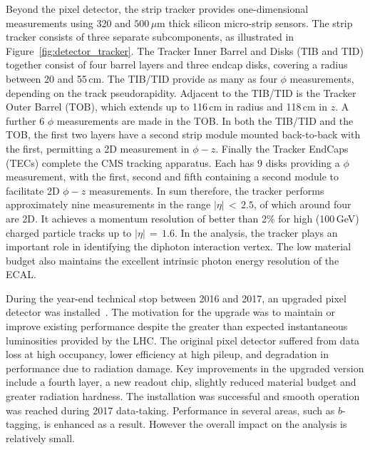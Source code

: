 Beyond the pixel detector, the strip tracker provides one-dimensional measurements using 320 and $500\,\mu\textrm{m}$ thick silicon micro-strip sensors.
The strip tracker consists of three separate subcomponents, as illustrated in Figure~\ref{fig:detector_tracker}.
The Tracker Inner Barrel and Disks (TIB and TID) together consist of four barrel layers and three endcap disks, covering a radius between 20 and 55\,cm. %
The TIB/TID provide as many as four $\phi$ measurements, depending on the track pseudorapidity.
Adjacent to the TIB/TID is the Tracker Outer Barrel (TOB), which extends up to 116\,cm in radius and 118\,cm in $z$.
A further 6 $\phi$ measurements are made in the TOB.
In both the TIB/TID and the TOB, the first two layers have a second strip module mounted back-to-back with the first, permitting a 2D measurement in $\phi-z$.
Finally the Tracker EndCaps (TECs) complete the CMS tracking apparatus.
Each has 9 disks providing a $\phi$ measurement, with the first, second and fifth containing a second module to facilitate 2D $\phi-z$ measurements.
In sum therefore, the tracker performs approximately nine measurements in the range $|\eta|\,<\,2.5$, of which around four are 2D.
It achieves a momentum resolution of better than 2\% for high \pt (100\,GeV) charged particle tracks up to $|\eta|\,=\,1.6$. %
In the \Hgg analysis, the tracker plays an important role in identifying the diphoton interaction vertex. %
The low material budget also maintains the excellent intrinsic photon energy resolution of the ECAL.

During the year-end technical stop between 2016 and 2017, an upgraded pixel detector was installed~\cite{PixelUpgrade}.
The motivation for the upgrade was to maintain or improve existing performance despite the greater than expected instantaneous luminosities provided by the LHC.
The original pixel detector suffered from data loss at high occupancy, lower efficiency at high pileup, and degradation in performance due to radiation damage.
Key improvements in the upgraded version include a fourth layer, a new readout chip, slightly reduced material budget and greater radiation hardness.
The installation was successful and smooth operation was reached during 2017 data-taking.
Performance in several areas, such as $b$-tagging, is enhanced as a result.
However the overall impact on the \Hgg analysis is relatively small.

